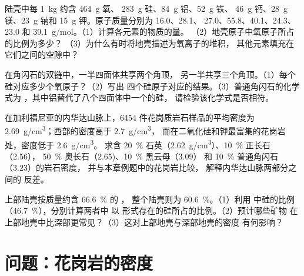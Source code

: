 \begin{exercise}[$\star\star\star$]\label{exo:g11:minerals:12}
陆壳中每 \qty{1}{kg} 约含 \qty{464}{g} 氧、
\qty{283}{g} 硅、\qty{84}{g} 铝、\qty{52}{g} 铁、
\qty{46}{g} 钙、\qty{28}{g} 镁、\qty{23}{g} 钠和
\qty{15}{g} 钾。原子质量分别为 \qty{16.0}{}、\qty{28.1}{}、
\qty{27.0}{}、\qty{55.8}{}、\qty{40.1}{}、\qty{24.3}{}、\qty{23.0}{} 和
\qty{39.1}{g/mol}。（1）计算各元素的物质的量。
（2）地壳原子中氧原子所占的比例为多少？
（3）为什么有时将地壳描述为氧离子的堆积，
其他元素填充在它们之间的空隙中？
\end{exercise}

\begin{exercise}[$\star\star\star$]\label{exo:g11:minerals:13}
在角闪石的双链中，一半四面体共享两个角顶，
另一半共享三个角顶。（1）每个硅对应多少个氧原子？（2）写出
四个硅原子对应的结果。（3）普通角闪石的化学式为
，其中铝替代了八个四面体中一个的硅，
请检验该化学式是否相符。
\end{exercise}

\begin{exercise}[$\star\star\star$]\label{exo:g11:minerals:14}
在加利福尼亚的内华达山脉上，\num{6454} 件花岗质岩石样品的平均密度为
\qty{2.69}{g/cm^3}；西部的密度高于 \qty{2.7}{g/cm^3}，
而在二氧化硅和钾最富集的花岗岩处，密度低于 \qty{2.6}{g/cm^3}。
求含 \qty{20}{\percent} 石英（\qty{2.62}{g/cm^3}）、\qty{10}{\percent} 正长石（\qty{2.56}{}），
\qty{50}{\percent} 奥长石（\qty{2.65}{})、\qty{10}{\percent} 黑云母（\qty{3.09}{}）
和 \qty{10}{\percent} 普通角闪石（\qty{3.23}{}）的岩石密度，
并与本章例题中的花岗岩比较，
解释内华达山脉两部分之间的
反差。
\end{exercise}

\begin{exercise}[$\star\star\star$]\label{exo:g11:minerals:15}
上部陆壳按质量约含 \qty{66.6}{\percent} 的 ，
整个陆壳则为 \qty{60.6}{\percent}。（1）利用
 中硅的比例（\qty{46.7}{\percent}），分别计算两者中
以  形式存在的硅所占的比例。（2）预计哪些矿物
在上部地壳中比深部更常见？（3）这对上部地壳与深部地壳的密度
有何影响？
\end{exercise}

\section{问题：花岗岩的密度}

